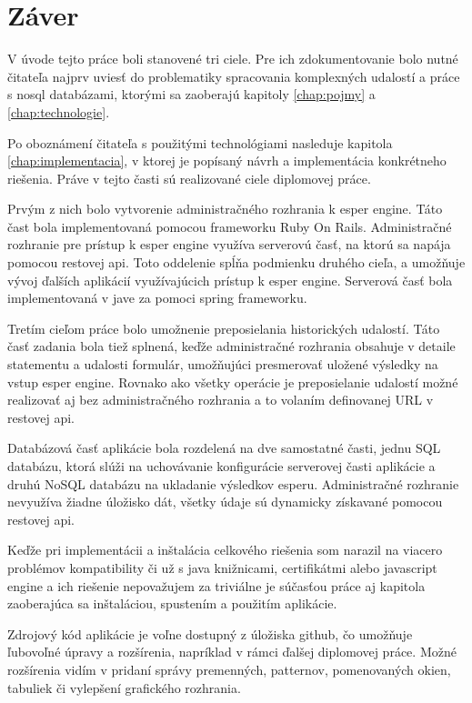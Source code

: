 \chapter*{Záver}

V úvode tejto práce boli stanovené tri ciele. Pre ich zdokumentovanie bolo nutné čitateľa najprv uviesť do problematiky spracovania komplexných udalostí a práce s nosql databázami, ktorými sa zaoberajú kapitoly \ref{chap:pojmy} a \ref{chap:technologie}.

Po oboznámení čitateľa s použitými technológiami nasleduje kapitola \ref{chap:implementacia}, v ktorej je popísaný návrh a implementácia konkrétneho riešenia. Práve v tejto časti sú realizované ciele diplomovej práce.

Prvým z nich bolo vytvorenie administračného rozhrania k esper engine. Táto čast bola implementovaná pomocou frameworku Ruby On Rails. Administračné rozhranie pre prístup k esper engine využíva serverovú časť, na ktorú sa napája pomocou restovej api. Toto oddelenie spĺňa podmienku druhého cieľa, a umožňuje vývoj ďalších aplikácií využívajúcich prístup k esper engine. Serverová časť bola implementovaná v jave za pomoci spring frameworku.

Tretím cieľom práce bolo umožnenie preposielania historických udalostí. Táto časť zadania bola tiež splnená, keďže administračné rozhrania obsahuje v detaile statementu a udalosti formulár, umožňujúci presmerovať uložené výsledky na vstup esper engine. Rovnako ako všetky operácie je preposielanie udalostí možné realizovať aj bez administračného rozhrania a to volaním definovanej URL v restovej api.

Databázová časť aplikácie bola rozdelená na dve samostatné časti, jednu SQL databázu, ktorá slúži na uchovávanie konfigurácie serverovej časti aplikácie a druhú NoSQL databázu na ukladanie výsledkov esperu. Administračné rozhranie nevyužíva žiadne úložisko dát, všetky údaje sú dynamicky získavané pomocou restovej api.

Keďže pri implementácii a inštalácia celkového riešenia som narazil na viacero problémov kompatibility či už s java knižnicami, certifikátmi alebo javascript engine a ich riešenie nepovažujem za triviálne je súčasťou práce aj kapitola zaoberajúca sa inštaláciou, spustením a použitím aplikácie.

Zdrojový kód aplikácie je voľne dostupný z úložiska github, čo umožňuje ľubovoľné úpravy a rozšírenia, napríklad v rámci ďalšej diplomovej práce. Možné rozšírenia vidím v pridaní správy premenných, patternov, pomenovaných okien, tabuliek či vylepšení grafického rozhrania.

\emptydoublepage

